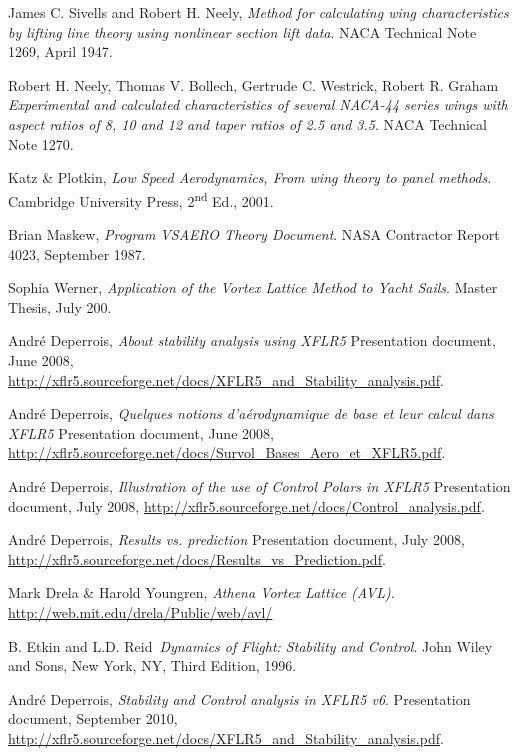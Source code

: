 \documentclass[a4paper,twoside,12pt,dvips]{article}
\begin{document}
\begin{thebibliography}{99}

  James C. Sivells and Robert H. Neely,
  \emph{Method for calculating wing characteristics by lifting line theory using nonlinear section lift data}.
  NACA Technical Note 1269,
  April 1947.

  Robert H. Neely, Thomas V. Bollech, Gertrude C. Westrick, Robert R. Graham
  \emph{Experimental and calculated characteristics of several NACA-44 series wings with aspect ratios of 8, 10 and 12 and taper ratios of 2.5 and 3.5}.
  NACA Technical Note 1270.

  Katz \& Plotkin, 
  \emph{Low Speed Aerodynamics, From wing theory to panel methods}.
  Cambridge University Press, 2\textsuperscript{nd} Ed.,
  2001.

  Brian Maskew,
  \emph{Program VSAERO Theory Document}.
  NASA Contractor Report 4023,
  September 1987.

  Sophia Werner,
  \emph{Application of the Vortex Lattice Method to Yacht Sails}.
  Master Thesis,
  July 200.

  André Deperrois,
  \emph{About stability analysis using XFLR5}
  Presentation document,
  June 2008,
  \url{http://xflr5.sourceforge.net/docs/XFLR5_and_Stability_analysis.pdf}.

  André Deperrois,
  \emph{Quelques notions d'a\'erodynamique de base et leur calcul dans XFLR5}
  Presentation document,
  June 2008,
  \url{http://xflr5.sourceforge.net/docs/Survol_Bases_Aero_et_XFLR5.pdf}.

  André Deperrois,
  \emph{Illustration of the use of Control Polars in XFLR5}
  Presentation document,
  July 2008,
  \url{http://xflr5.sourceforge.net/docs/Control_analysis.pdf}.

  André Deperrois,
  \emph{Results vs. prediction}
  Presentation document,
  July 2008,
  \url{http://xflr5.sourceforge.net/docs/Results_vs_Prediction.pdf}.

  Mark Drela \& Harold Youngren,
  \emph{Athena Vortex Lattice (AVL)}.
  \url{http://web.mit.edu/drela/Public/web/avl/}

  B. Etkin and L.D. Reid\
  \emph{Dynamics of Flight: Stability and Control}.
  John Wiley and Sons, New York, NY, Third Edition, 
  1996.

  André Deperrois,
  \emph{Stability and Control analysis in XFLR5 v6}.
  Presentation document,
  September 2010,
  \url{http://xflr5.sourceforge.net/docs/XFLR5_and_Stability_analysis.pdf}.

\end{thebibliography}
\end{document}
